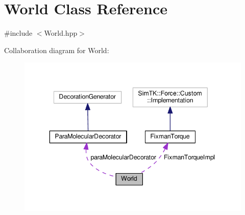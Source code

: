 \hypertarget{classWorld}{}\section{World Class Reference}
\label{classWorld}


{\ttfamily \#include $<$World.\+hpp$>$}



Collaboration diagram for World\+:\nopagebreak
\begin{figure}[H]
\begin{center}
\leavevmode
\includegraphics[width=343pt]{classWorld__coll__graph}
\end{center}
\end{figure}

